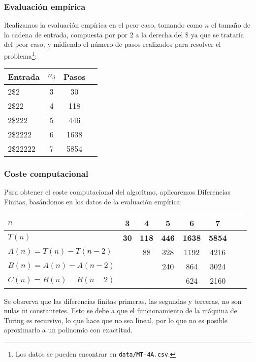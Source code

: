\subsubsection*{Evaluación empírica}
Realizamos la evaluación empírica en el peor caso, tomando como $n$ el tamaño de la cadena de entrada, compuesta por por 2 a la derecha del \$ ya que se trataría del peor caso, y midiendo el número de pasos realizados para resolver el problema\footnote{Los datos se pueden encontrar en \texttt{data/MT-4A.csv}.}:

\begin{table}[H]
    \centering
    \begin{tabular}{lccc}
        Entrada & $n_d$ & Pasos \\
        \hline
        2\$2                     & 3  & 30   \\
        2\$22                    & 4  & 118   \\
        2\$222                   & 5  & 446  \\
        2\$2222                  & 6  & 1638  \\
        2\$22222                 & 7  & 5854  \\
    \end{tabular}
\end{table}


\subsubsection*{Coste computacional}
Para obtener el coste computacional del algoritmo, aplicaremos Diferencias Finitas, basándonos en los datos de la evaluación empírica:

\begin{table}[H]
    \centering
    \begin{tabular}{|l|c|c|c|c|c|c|c|}
        \hline
        $n$ & \textbf{3} & \textbf{4} & \textbf{5} & \textbf{6} & \textbf{7}\\ \hline
        $T(n)$ & \textbf{30} & \textbf{118} & \textbf{446} & \textbf{1638} & \textbf{5854}      \\ \hline
        \hline
        $A(n) = T(n) - T(n-2)$ &    & 88 & 328 & 1192 & 4216 \\ \hline
        $B(n) = A(n) - A(n-2)$ &    &   & 240 & 864 & 3024 \\ \hline
        $C(n) = B(n) - B(n-2)$ &    &   &    & 624 & 2160 \\ \hline
    \end{tabular}
\end{table}

Se obsrerva que las diferencias finitas primeras, las segundas y terceras, no son nulas ni constantetes. Esto se debe a que el funcionamiento de la máquina de Turing es recursivo, lo que hace que no sea lineal, por lo que no es posible aproximarlo a un polinomio con exactitud.\\
